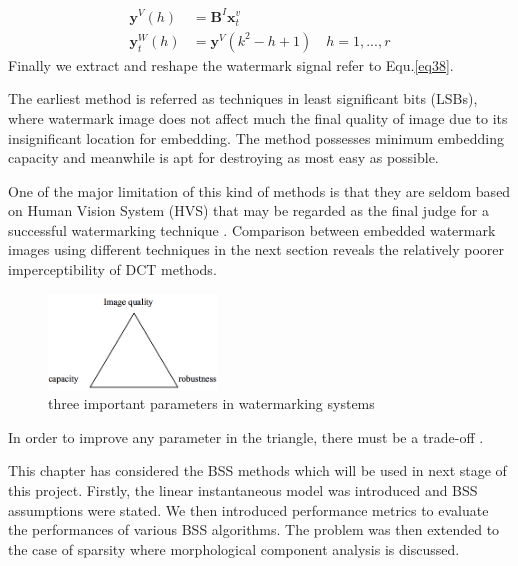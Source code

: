 \begin{align}
    \mathbf{y}^V(h)  &=  \mathbf{B}^I\mathbf{x}_t^v \\
    \mathbf{y}_t^W(h) &= \mathbf{y}^V(k^2-h+1) \quad h = 1,...,r
    \label{eq38}
\end{align}
Finally we extract and reshape the watermark signal refer to Equ.\ref{eq38}. 

The earliest method is referred as techniques in least significant bits (LSBs), where watermark image does not affect much the final quality of image due to its insignificant location for embedding. The method possesses minimum embedding capacity and meanwhile is apt for destroying as most easy as possible.

One of the major limitation of this kind of methods is that they are seldom based on Human Vision System (HVS) that may be regarded as the final judge for a successful watermarking technique \cite{LuWei_ICA}. Comparison between embedded watermark images using different techniques in the next section reveals the relatively poorer imperceptibility of DCT methods.


\begin{figure}[H]
\centering
\includegraphics[width=0.4\textwidth]{images/watermark_tradeoff.png}
\caption{ three important parameters in watermarking systems}
\label{trade-off}
\end{figure}
In order to improve any parameter in the triangle, there
must be a trade-off \cite{DCT_watermark}. 

This chapter has considered the BSS methods which will be used in next stage of this project. Firstly, the linear instantaneous model was introduced and BSS assumptions were stated. We then introduced performance metrics to evaluate the performances of various BSS algorithms. The problem was then extended to the case of sparsity where morphological component analysis is discussed. 